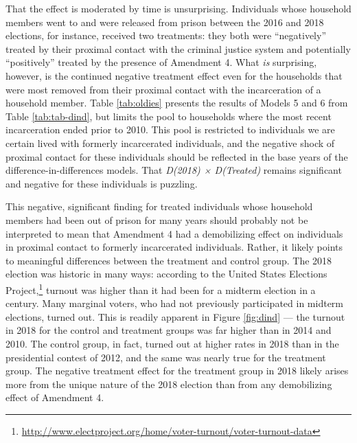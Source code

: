 \documentclass[
  12pt,
]{article}
\begin{document}
That the effect is moderated by time is unsurprising. Individuals whose household members went to and were released from prison between the 2016 and 2018 elections, for instance, received two treatments: they both were ``negatively'' treated by their proximal contact with the criminal justice system and potentially ``positively'' treated by the presence of Amendment 4. What \emph{is} surprising, however, is the continued negative treatment effect even for the households that were most removed from their proximal contact with the incarceration of a household member. Table \ref{tab:oldies} presents the results of Models 5 and 6 from Table \ref{tab:tab-dind}, but limits the pool to households where the most recent incarceration ended prior to 2010. This pool is restricted to individuals we are certain lived with formerly incarcerated individuals, and the negative shock of proximal contact for these individuals should be reflected in the base years of the difference-in-differences models. That \emph{D(2018) × D(Treated)} remains significant and negative for these individuals is puzzling.

\begin{singlespace}

\end{singlespace}

This negative, significant finding for treated individuals whose household members had been out of prison for many years should probably not be interpreted to mean that Amendment 4 had a demobilizing effect on individuals in proximal contact to formerly incarcerated individuals. Rather, it likely points to meaningful differences between the treatment and control group. The 2018 election was historic in many ways: according to the United States Elections Project,\footnote{\url{http://www.electproject.org/home/voter-turnout/voter-turnout-data}} turnout was higher than it had been for a midterm election in a century. Many marginal voters, who had not previously participated in midterm elections, turned out. This is readily apparent in Figure \ref{fig:dind} --- the turnout in 2018 for the control and treatment groups was far higher than in 2014 and 2010. The control group, in fact, turned out at higher rates in 2018 than in the presidential contest of 2012, and the same was nearly true for the treatment group. The negative treatment effect for the treatment group in 2018 likely arises more from the unique nature of the 2018 election than from any demobilizing effect of Amendment 4.
\end{document}
